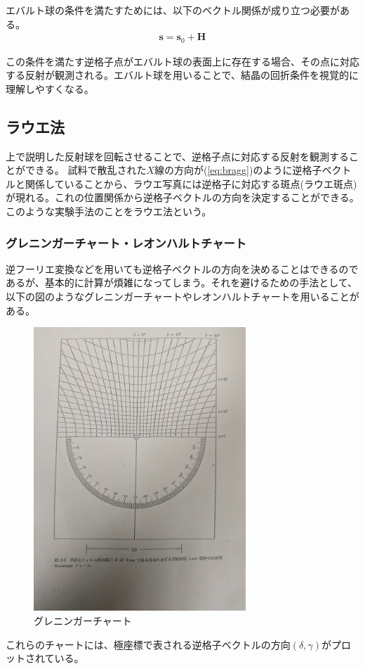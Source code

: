 \documentclass[a4paper,11pt]{jsarticle}
\begin{document}
エバルト球の条件を満たすためには、以下のベクトル関係が成り立つ必要がある。
\begin{align}
  \bm{s} = \bm{s}_0 + \bm{H}
\end{align}

この条件を満たす逆格子点がエバルト球の表面上に存在する場合、その点に対応する反射が観測される。エバルト球を用いることで、結晶の回折条件を視覚的に理解しやすくなる。

\subsection{ラウエ法}
上で説明した反射球を回転させることで、逆格子点に対応する反射を観測することができる。
試料で散乱された$X$線の方向が(\ref{eq:bragg})のように逆格子ベクトルと関係していることから、ラウエ写真には逆格子に対応する斑点(ラウエ斑点)が現れる。これの位置関係から逆格子ベクトルの方向を決定することができる。
このような実験手法のことをラウエ法という。

\subsubsection{グレニンガーチャート・レオンハルトチャート}
逆フーリエ変換などを用いても逆格子ベクトルの方向を決めることはできるのであるが、基本的に計算が煩雑になってしまう。それを避けるための手法として、
以下の図のようなグレニンガーチャートやレオンハルトチャートを用いることがある。
\begin{figure}[H]
    \begin{center}
    \includegraphics[width=80mm]{g.jpg}
    \end{center}
    \caption{グレニンガーチャート}
    \label{fig:g}
\end{figure} 
これらのチャートには、極座標で表される逆格子ベクトルの方向$(\delta,\gamma)$がプロットされている。
\end{document}
